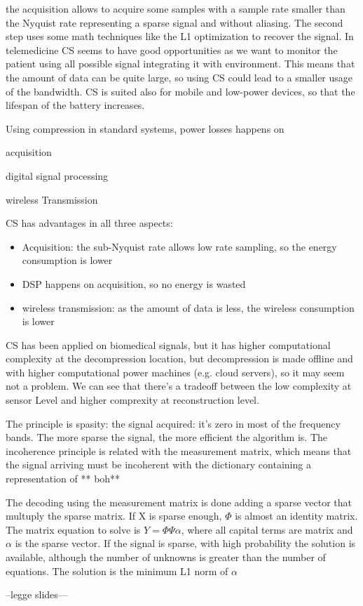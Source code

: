 the acquisition allows to acquire some samples with a sample rate smaller than the Nyquist rate representing a sparse signal and without aliasing. The second step uses some math techniques like the L1 optimization to recover the signal. In telemedicine CS seems to have good opportunities as we want to monitor the patient using all possible signal integrating it with environment. This means that the amount of data can be quite large, so using CS could lead to a smaller usage of the bandwidth. CS is suited also for mobile and low-power devices, so that the lifespan of the battery increases.

Using compression in standard systems, power losses happens on

acquisition

digital signal processing

wireless Transmission


CS has advantages in all three aspects:

\begin{itemize}
  \item Acquisition: the sub-Nyquist rate allows low rate sampling, so the energy consumption is lower
  \item DSP happens on acquisition, so no energy is wasted
  \item wireless transmission: as the amount of data is less, the wireless consumption is lower
\end{itemize}

CS has been applied on biomedical signals, but it has higher computational complexity at the decompression location, but decompression is made offline and with higher computational power machines (e.g. cloud servers), so it may seem not a problem. We can see that there's a tradeoff between the low complexity at sensor Level and higher comprexity at reconstruction level.


The principle is spasity: the signal acquired: it's zero in most of the frequency bands. The more sparse the signal, the more efficient the algorithm is. The incoherence principle is related with the measurement matrix, which means that the signal arriving must be incoherent with the dictionary containing a representation of ** boh**

The decoding using the measurement matrix is done adding a sparse vector that multuply the sparse matrix. If X is sparse enough, $\Phi$ is almost an identity matrix. The matrix equation to solve is $Y = \Phi \Psi \alpha$, where all capital terms are matrix and $\alpha$ is the sparse vector. If the signal is sparse, with high probability the solution is available, although the number of unknowns is greater than the number of equations. The solution is the minimum L1 norm of $\alpha$


--legge slides---
